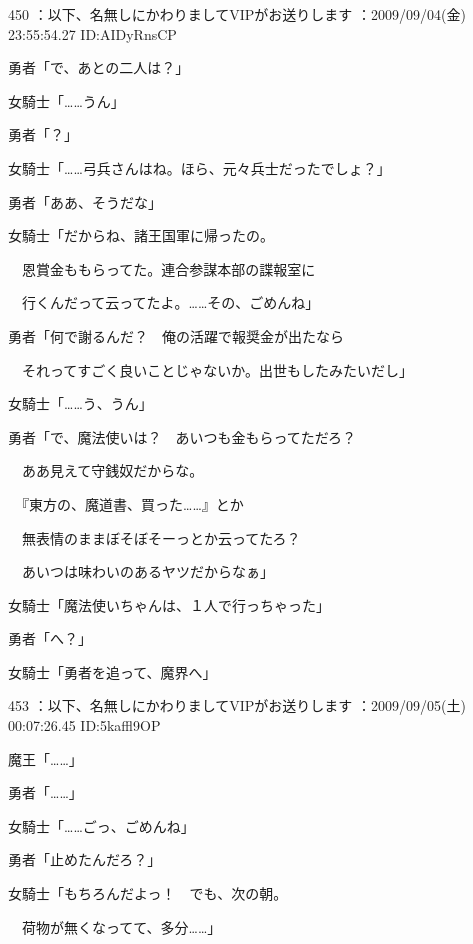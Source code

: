 \documentclass[a4j,twocolumn]{tarticle}
\begin{document}
	
    
    

450 ：以下、名無しにかわりましてVIPがお送りします ：2009/09/04(金) 23:55:54.27 ID:AIDyRnsCP 


勇者「で、あとの二人は？」\par{} 
女騎士「……うん」 



勇者「？」 



女騎士「……弓兵さんはね。ほら、元々兵士だったでしょ？」\par{} 
勇者「ああ、そうだな」 



女騎士「だからね、諸王国軍に帰ったの。\par{} 
　恩賞金ももらってた。連合参謀本部の諜報室に\par{} 
　行くんだって云ってたよ。……その、ごめんね」 



勇者「何で謝るんだ？　俺の活躍で報奨金が出たなら\par{} 
　それってすごく良いことじゃないか。出世もしたみたいだし」 



女騎士「……う、うん」 



勇者「で、魔法使いは？　あいつも金もらってただろ？\par{} 
　ああ見えて守銭奴だからな。\par{} 
　『東方の、魔道書、買った……』とか\par{} 
　無表情のままぼそぼそーっとか云ってたろ？\par{} 
　あいつは味わいのあるヤツだからなぁ」 



女騎士「魔法使いちゃんは、１人で行っちゃった」\par{} 
勇者「へ？」 



女騎士「勇者を追って、魔界へ」 

	
    
    

453 ：以下、名無しにかわりましてVIPがお送りします ：2009/09/05(土) 00:07:26.45 ID:5kaffl9OP 


魔王「……」\par{} 
勇者「……」\par{} 
女騎士「……ごっ、ごめんね」 



勇者「止めたんだろ？」\par{} 
女騎士「もちろんだよっ！　でも、次の朝。\par{} 
　荷物が無くなってて、多分……」 
\end{document}
